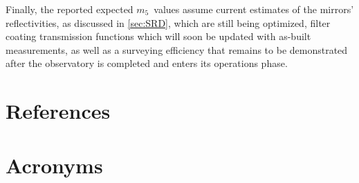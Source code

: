 \documentclass[PST,authoryear,toc]{lsstdoc}
\newcommand{\mf}{\ensuremath{m_5}}
\begin{document}
Finally, the reported expected \mf\ values assume current estimates of the mirrors' reflectivities, as discussed in \autoref{sec:SRD}, which are still being optimized, filter coating transmission functions which will soon be updated with as-built measurements, as well as a surveying efficiency that remains to be demonstrated after the observatory is completed and enters its operations phase. 


\appendix
\section{References} \label{sec:bib}
\renewcommand{\refname}{} %


\section{Acronyms} \label{sec:acronyms}

\end{document}

